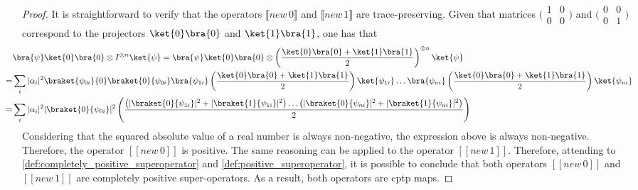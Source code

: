 \begin{proof}
  It is straightforward to verify that the operators $ \llbracket \textit{new} \, 0 \rrbracket $ and $\llbracket\textit{new} \, 1 \rrbracket$ are trace-preserving.
Given that matrices $\big(\begin{smallmatrix} 1 & 0\\ 0 & 0 \end{smallmatrix}\big)$ and $\big(\begin{smallmatrix} 0 & 0\\ 0 & 1 \end{smallmatrix}\big)$ correspond to the projectors $\ket{0}\bra{0}$ and $\ket{1}\bra{1}$, one has that 
\begin{align} \label{eq:prove_new_0}
  \hspace{-20pt} &  \bra{\psi} \ket{0}\bra{0} \otimes I^{\otimes n} \ket{\psi}  = \bra{\psi} \ket{0}\bra{0} \otimes \left(\frac{\ket{0}\bra{0} + \ket{1}\bra{1}}{2}\right)^{\otimes n} \ket{\psi} \\
  \hspace{-20pt} =  &  \sum_{i} |\alpha_i|^{2} \braket{\psi_{0i}}{0}\braket{0}{\psi_{0i}} \bra{\psi_{1i}} \left(\frac{\ket{0}\bra{0} + \ket{1}\bra{1}}{2}\right)\ket{\psi_{1i}} \ldots \bra{\psi_{ni}} \left(\frac{\ket{0}\bra{0} + \ket{1}\bra{1}}{2}\right)\ket{\psi_{ni}}   \\
  \hspace{-20pt} = & \sum_{i}  |\alpha_i|^{2} |\braket{0}{\psi_{0i}}|^{2} \left( \frac{ \left( |\braket{0}{\psi_{1i}}|^{2} +  |\braket{1}{\psi_{1i}}|^{2} \right) \ldots \left( |\braket{0}{\psi_{ni}}|^{2} +  |\braket{1}{\psi_{ni}}|^{2} \right) }{2}  \right)    \\
\end{align}
Considering that the squared absolute value of a real number is always non-negative, the expression above is always non-negative. Therefore, the operator $[\![\textit{new} \,0 ]\!]$ is positive. The same reasoning can be applied to the operator $[\![\textit{new} \,1 ]\!]$. Therefore, attending to \autoref{def:completely_positive_superoperator} and \autoref{def:positive_superoperator}, it is possible to conclude that both operators $[\![\textit{new} \,0 ]\!]$ and $[\![\textit{new} \, 1 ] \!]$ are completely positive super-operators. As a result, both operators are \acrshort{cptp} maps.

\end{proof}

